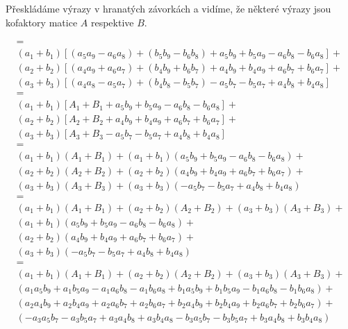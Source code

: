 Přeskládáme výrazy v hranatých závorkách  a vidíme, že některé výrazy jsou kofaktory matice $A$ respektive $B$.

\begin{gather*}
= \\
(a_1 + b_1) \left[(a_5 a_9 - a_6 a_8) + (b_5 b_9 - b_6 b_8) + a_5 b_9 + b_5 a_9 - a_6 b_8 - b_6 a_8\right] + \\
(a_2 + b_2) \left[(a_4 a_9 + a_6 a_7) + (b_4 b_9 + b_6 b_7) + a_4 b_9 + b_4 a_9 + a_6 b_7 + b_6 a_7\right] + \\
(a_3 + b_3) \left[(a_4 a_8 - a_5 a_7) + (b_4 b_8 - b_5 b_7) - a_5 b_7 - b_5 a_7 + a_4 b_8 + b_4 a_8\right]   \\
= \\
(a_1 + b_1) \left[A_1 + B_1 + a_5 b_9 + b_5 a_9 - a_6 b_8 - b_6 a_8\right] + \\
(a_2 + b_2) \left[A_2 + B_2 + a_4 b_9 + b_4 a_9 + a_6 b_7 + b_6 a_7\right] + \\
(a_3 + b_3) \left[A_3 + B_3 - a_5 b_7 - b_5 a_7 + a_4 b_8 + b_4 a_8\right]   \\
= \\
(a_1 + b_1) (A_1 + B_1) + (a_1 + b_1)(a_5 b_9 + b_5 a_9 - a_6 b_8 - b_6 a_8) + \\
(a_2 + b_2) (A_2 + B_2) + (a_2 + b_2)(a_4 b_9 + b_4 a_9 + a_6 b_7 + b_6 a_7) + \\
(a_3 + b_3) (A_3 + B_3) + (a_3 + b_3)(-a_5 b_7 - b_5 a_7 + a_4 b_8 + b_4 a_8)  \\
= \\
(a_1 + b_1) (A_1 + B_1) + (a_2 + b_2) (A_2 + B_2)  + (a_3 + b_3) (A_3 + B_3) + \\
(a_1 + b_1)(a_5 b_9 + b_5 a_9 - a_6 b_8 - b_6 a_8) + \\
(a_2 + b_2)(a_4 b_9 + b_4 a_9 + a_6 b_7 + b_6 a_7) + \\
(a_3 + b_3)(-a_5 b_7 - b_5 a_7 + a_4 b_8 + b_4 a_8)  \\
= \\
(a_1 + b_1) (A_1 + B_1) + (a_2 + b_2) (A_2 + B_2)  + (a_3 + b_3) (A_3 + B_3) + \\
(a_1 a_5 b_9 + a_1 b_5 a_9 - a_1 a_6 b_8 - a_1 b_6 a_8 + b_1 a_5 b_9 + b_1 b_5 a_9 - b_1 a_6 b_8 - b_1 b_6 a_8) + \\ (a_2 a_4 b_9 + a_2 b_4 a_9 + a_2 a_6 b_7 + a_2 b_6 a_7 + b_2 a_4 b_9 + b_2 b_4 a_9 + b_2 a_6 b_7 + b_2 b_6 a_7) + \\ (-a_3 a_5 b_7 -a_3 b_5 a_7 + a_3 a_4 b_8 + a_3 b_4 a_8 - b_3 a_5 b_7 - b_3 b_5 a_7 + b_3 a_4 b_8 + b_3 b_4 a_8)   \\

\end{gather*}
